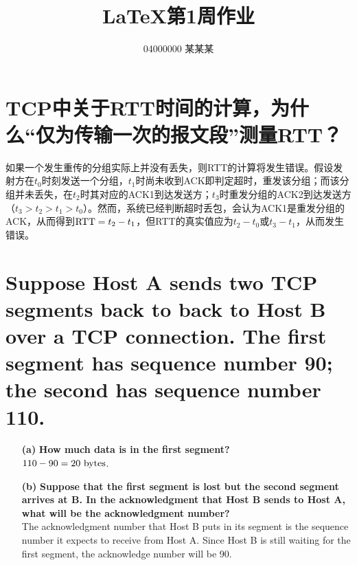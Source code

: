 \documentclass[a4paper, 12pt, centering, AutoFakeBold]{article}
\title{\textbf{\LaTeX 第1周作业}}
\author{04000000 某某某}
\begin{document}
\maketitle


\section{TCP中关于RTT时间的计算，为什么“仅为传输一次的报文段”测量RTT？}
如果一个发生重传的分组实际上并没有丢失，则RTT的计算将发生错误。假设发射方在$t_0$时刻发送一个分组，$t_1$时尚未收到ACK即判定超时，重发该分组；而该分组并未丢失，在$t_2$时其对应的ACK1到达发送方；$t_3$时重发分组的ACK2到达发送方（$t_3 > t_2 > t_1 > t_0$）。然而，系统已经判断超时丢包，会认为ACK1是重发分组的ACK，从而得到${\rm RTT} = t_2 -t_1$，但RTT的真实值应为$t_2 - t_0$或$t_3 - t_1$，从而发生错误。

\section{Suppose Host A sends two TCP segments back to back to Host B over a TCP connection. The first segment has sequence number 90; the second has sequence number 110.}
\begin{itemize}
    \item[\textbf{(a)}] \textbf{How much data is in the first segment?} \\
        $110 - 90 = 20\ \rm{bytes}$.
    \item[\textbf{(b)}] \textbf{Suppose that the first segment is lost but the second segment arrives at B. In the acknowledgment that Host B sends to Host A, what will be the acknowledgment number?} \\
        The acknowledgment number that Host B puts in its segment is the sequence number it expects to receive from Host A. Since Host B is still waiting for the first segment, the acknowledge number will be 90. 
\end{itemize}

\end{document}
